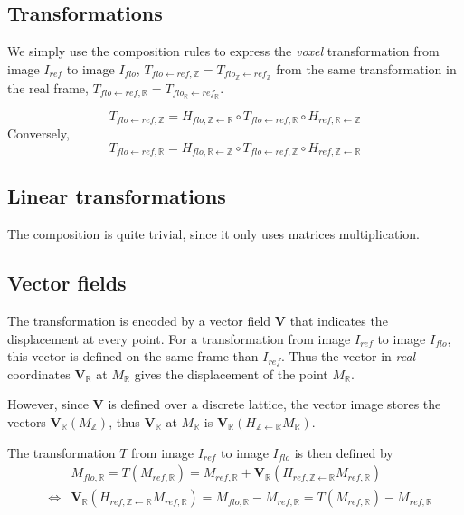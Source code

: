 \documentclass[10pt]{report}
\begin{document}
\subsection{Transformations}

We simply use the composition rules to express the \textit{voxel} transformation from image $I_{ref}$ to image $I_{flo}$, $T_{flo \leftarrow ref, \mathbb{Z}} = T_{flo_\mathbb{Z} \leftarrow ref_\mathbb{Z}}$ from the same transformation in the real frame, 
$T_{flo \leftarrow ref, \mathbb{R}} = T_{flo_\mathbb{R} \leftarrow ref_\mathbb{R}}$.

$$
T_{flo \leftarrow ref, \mathbb{Z}} 
=
H_{flo,\mathbb{Z} \leftarrow \mathbb{R}} \circ
T_{flo \leftarrow ref, \mathbb{R}} \circ
H_{ref,\mathbb{R} \leftarrow \mathbb{Z}}
$$
Conversely,
$$
T_{flo \leftarrow ref, \mathbb{R}} 
=
H_{flo,\mathbb{R} \leftarrow \mathbb{Z}} \circ
T_{flo \leftarrow ref, \mathbb{Z}} \circ
H_{ref,\mathbb{Z} \leftarrow \mathbb{R}}
$$

\subsection{Linear transformations}

The composition is quite trivial, since it only uses matrices multiplication.

\subsection{Vector fields}

The transformation is encoded by a vector field $\mathbf{V}$ that indicates the displacement at every point. For a transformation from image $I_{ref}$ to image $I_{flo}$, this vector is defined on the same frame than $I_{ref}$. Thus the vector in \textit{real} coordinates $\mathbf{V}_{\mathbb{R}}$ at $M_{\mathbb{R}}$ gives the displacement of the point $M_{\mathbb{R}}$.

However, since $\mathbf{V}$ is defined over a discrete lattice, the vector image stores the vectors $\mathbf{V}_{\mathbb{R}}(M_{\mathbb{Z}})$, thus $\mathbf{V}_{\mathbb{R}}$ at $M_{\mathbb{R}}$ is $\mathbf{V}_{\mathbb{R}}( H_{\mathbb{Z} \leftarrow \mathbb{R}} M_{\mathbb{R}} )$.

The transformation $T$ from image $I_{ref}$ to image $I_{flo}$ is then defined by
\begin{eqnarray*}
&&
M_{flo,\mathbb{R}} = 
T(M_{ref,\mathbb{R}}) = M_{ref,\mathbb{R}} + \mathbf{V}_{\mathbb{R}}( H_{ref, \mathbb{Z} \leftarrow \mathbb{R}} M_{ref,\mathbb{R}} )\\
& \Leftrightarrow &
\mathbf{V}_{\mathbb{R}}( H_{ref, \mathbb{Z} \leftarrow \mathbb{R}} M_{ref,\mathbb{R}} )
= M_{flo,\mathbb{R}} - M_{ref,\mathbb{R}}
= T(M_{ref,\mathbb{R}}) - M_{ref,\mathbb{R}}
\end{eqnarray*}
\end{document}
